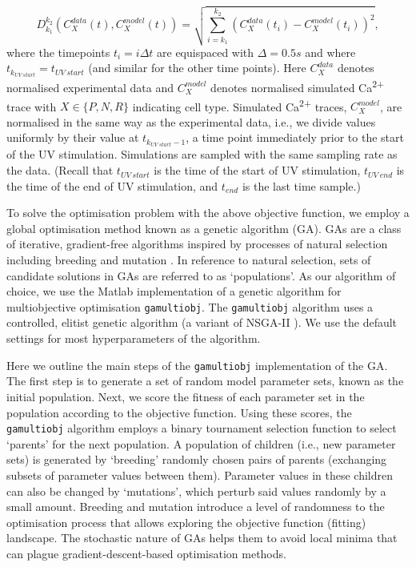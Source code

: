 \documentclass[
  10pt,
  onecolumn]{article}
\begin{document}
\begin{equation*}
 D_{k_1}^{k_2}\left({C}_X^{data}(t),{C}_X^{model}(t)\right)=\sqrt{\sum_{i=k_1}^{k_2}\left({C}_{X}^{data}(t_i)-{C}_{X}^{model}(t_i)\right)^2} ,   
\end{equation*} where the timepoints \(t_i = i \Delta t\) are equispaced
with \(\Delta = 0.5s\) and where
\(t_{k_{UV\: start}} = t_{UV \: start}\) (and similar for the other time
points). Here \({C}_X^{data}\) denotes normalised experimental data and
\({C}_X^{model}\) denotes normalised simulated Ca\textsuperscript{2+}
trace with \(X \in \{ P, N, R\}\) indicating cell type. Simulated
Ca\textsuperscript{2+} traces, \({C}_X^{model}\), are normalised in the
same way as the experimental data, i.e., we divide values uniformly by
their value at \(t_{k_{UV\: start}-1}\), a time point immediately prior
to the start of the UV stimulation. Simulations are sampled with the
same sampling rate as the data. (Recall that \(t_{UV\: start}\) is the
time of the start of UV stimulation, \(t_{UV\: end}\) is the time of the
end of UV stimulation, and \(t_{end}\) is the last time sample.)

To solve the optimisation problem with the above objective function, we
employ a global optimisation method known as a genetic algorithm (GA).
GAs are a class of iterative, gradient-free algorithms inspired by
processes of natural selection including breeding and mutation
\cite{GAbook}. In reference to natural selection, sets of candidate
solutions in GAs are referred to as `populations'. As our algorithm of
choice, we use the Matlab implementation of a genetic algorithm for
multiobjective optimisation \texttt{gamultiobj}. The \texttt{gamultiobj}
algorithm uses a controlled, elitist genetic algorithm (a variant of
NSGA-II \cite{GAbook}). We use the default settings for most
hyperparameters of the algorithm.

Here we outline the main steps of the \texttt{gamultiobj} implementation
of the GA. The first step is to generate a set of random model parameter
sets, known as the initial population. Next, we score the fitness of
each parameter set in the population according to the objective
function. Using these scores, the \texttt{gamultiobj} algorithm employs
a binary tournament selection function\cite{Miller1995GeneticAT} to
select `parents' for the next population. A population of children
(i.e., new parameter sets) is generated by `breeding' randomly chosen
pairs of parents (exchanging subsets of parameter values between them).
Parameter values in these children can also be changed by `mutations',
which perturb said values randomly by a small amount. Breeding and
mutation introduce a level of randomness to the optimisation process
that allows exploring the objective function (fitting) landscape. The
stochastic nature of GAs helps them to avoid local minima that can
plague gradient-descent-based optimisation methods.
\end{document}
